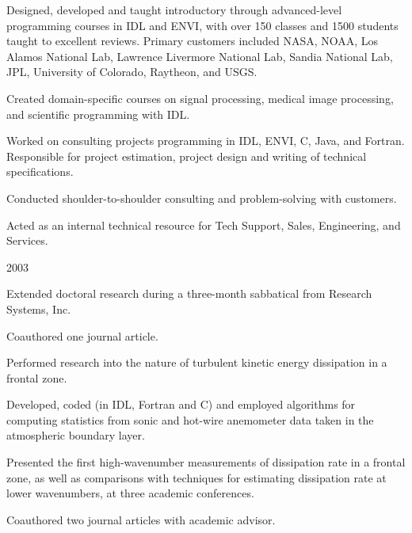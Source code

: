 \begin{compactitem}[\itembullet]
  \item Designed, developed and taught introductory through
    advanced-level programming courses in IDL and ENVI, with over 150
    classes and 1500 students taught to excellent reviews. Primary
    customers included NASA, NOAA, Los Alamos National Lab, Lawrence
    Livermore National Lab, Sandia National Lab, JPL, University of
    Colorado, Raytheon, and USGS.
  \item Created domain-specific courses on signal processing, medical
    image processing, and scientific programming with IDL.
  \item Worked on consulting projects programming in IDL, ENVI, C,
    Java, and Fortran. Responsible for project estimation, project
    design and writing of technical specifications.
  \item Conducted shoulder-to-shoulder consulting and problem-solving
    with customers.
  \item Acted as an internal technical resource for Tech Support,
    Sales, Engineering, and Services.
\end{compactitem}

 {2003}
\begin{compactitem}[\itembullet]
  \item Extended doctoral research during a three-month sabbatical
    from Research Systems, Inc.
  \item Coauthored one journal article.
\end{compactitem}

\begin{compactitem}[\itembullet]
  \item Performed research into the nature of turbulent kinetic energy
    dissipation in a frontal zone.
  \item Developed, coded (in IDL, Fortran and C) and employed
    algorithms for computing statistics from sonic and hot-wire
    anemometer data taken in the atmospheric boundary layer.
  \item Presented the first high-wavenumber measurements of
    dissipation rate in a frontal zone, as well as comparisons with
    techniques for estimating dissipation rate at lower wavenumbers,
    at three academic conferences.
  \item Coauthored two journal articles with academic advisor.
\end{compactitem}

